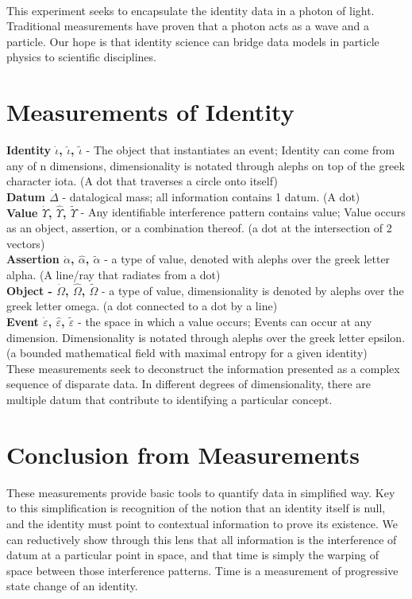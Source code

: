 \documentclass{article}
\begin{document}
\paragraph{}This experiment seeks to encapsulate the identity data in a photon of light.  Traditional measurements have proven that a photon acts as a wave and a particle.  Our hope is that identity science can bridge data models in particle physics to scientific disciplines.

\section{Measurements of Identity}
\textbf{Identity $\dot \iota$, $\hat \iota$, $\tilde \iota$} - The object that instantiates an event; Identity can come from any of n dimensions, dimensionality is notated through alephs on top of the greek character iota. (A dot that traverses a circle onto itself)  \\
\textbf{Datum $\dot \Delta$} - datalogical mass; all information contains 1 datum. (A dot) \\
\textbf{Value $\dot \Upsilon$, $\hat \Upsilon$, $\tilde \Upsilon$} - Any identifiable interference pattern contains value; Value occurs as an object, assertion, or a combination thereof. (a dot at the intersection of 2 vectors)  \\
\textbf{Assertion $\dot \alpha$, $\hat \alpha$, $\tilde \alpha$} - a type of value, denoted with alephs over the greek letter alpha. (A line/ray that radiates from a dot)\\
\textbf{Object -  $\dot \Omega$, $\hat \Omega$, $\tilde \Omega$} - a type of value, dimensionality is denoted by alephs over the greek letter omega. (a dot connected to a dot by a line) \\
\textbf{Event  $\dot \varepsilon$, $\hat \varepsilon$, $\tilde \varepsilon$} - the space in which a value occurs; Events can occur at any dimension.  Dimensionality is notated through alephs over the greek letter epsilon. (a bounded mathematical field with maximal entropy for a given identity) \\
These measurements seek to deconstruct the information presented as a complex sequence of disparate data.  In different degrees of dimensionality, there are multiple datum that contribute to identifying a particular concept.

\section{Conclusion from Measurements}
These measurements provide basic tools to quantify data in simplified way.  Key to this simplification is recognition of the notion that an identity itself is null, and the identity must point to contextual information to prove its existence. 
We can reductively show through this lens that all information is the interference of datum at a particular point in space, and that time is simply the warping of space between those interference patterns.  Time is a measurement of progressive state change of an identity.
\end{document}
